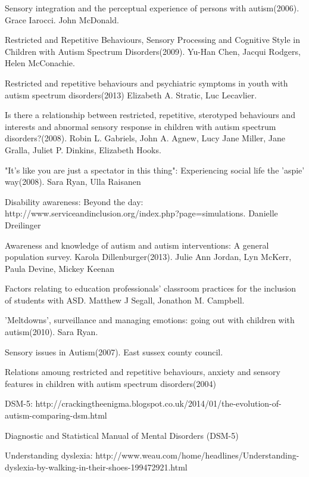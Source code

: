 \documentclass[11pt]{report}
\begin{document}
\begin{thebibliography}{9}
Sensory integration and the perceptual experience of persons with autism(2006). Grace Iarocci. John McDonald.

Restricted and Repetitive Behaviours, Sensory Processing and Cognitive Style in Children with Autism Spectrum Disorders(2009). Yu-Han Chen, Jacqui Rodgers, Helen McConachie.

Restricted and repetitive behaviours and psychiatric symptoms in youth with autism spectrum disorders(2013) Elizabeth A. Stratic, Luc Lecavlier.

Is there a relationship between restricted, repetitive, sterotyped behaviours and interests and abnormal sensory response in children with autism spectrum disorders?(2008). Robin L. Gabriels, John A. Agnew, Lucy Jane Miller, Jane Gralla, Juliet P. Dinkins, Elizabeth Hooks.

"It’s like you are just a spectator in this thing": Experiencing social life the 'aspie' way(2008). Sara Ryan, Ulla Raisanen

Disability awareness: Beyond the day: http://www.serviceandinclusion.org/index.php?page=simulations. Danielle Dreilinger

Awareness and knowledge of autism and autism interventions: A general population survey. Karola Dillenburger(2013). Julie Ann Jordan, Lyn McKerr, Paula Devine, Mickey Keenan

Factors relating to education professionals' classroom practices for the inclusion of students with ASD. Matthew J Segall, Jonathon M. Campbell. 

'Meltdowns', surveillance and managing emotions: going out with children with autism(2010). Sara Ryan.

Sensory issues in Autism(2007). East sussex county council. 

Relations amoung restricted and repetitive behaviours, anxiety and sensory features in children with autism spectrum disorders(2004)

DSM-5: http://crackingtheenigma.blogspot.co.uk/2014/01/the-evolution-of-autism-comparing-dsm.html

Diagnostic and Statistical Manual of Mental Disorders (DSM-5)

Understanding dyslexia: http://www.weau.com/home/headlines/Understanding-dyslexia-by-walking-in-their-shoes-199472921.html


\end{thebibliography}
\end{document}
